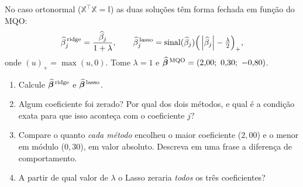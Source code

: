 \documentclass[11pt,a4paper]{article}
\begin{document}
\begin{exercicio}
No caso ortonormal ($\mathbb{X}^\top\mathbb{X}=\mathbb{I}$) as duas soluções têm forma fechada em
função do MQO:
\[
  \widehat\beta_j^{\,\text{ridge}} = \frac{\widehat\beta_j}{1+\lambda},
  \qquad
  \widehat\beta_j^{\,\text{lasso}}
     = \operatorname{sinal}(\widehat\beta_j)\Big(\left\lvert \widehat\beta_j \right\rvert-\tfrac{\lambda}{2}\Big)_+,
\]
onde $(u)_+=\max(u,0)$. Tome $\lambda=1$ e
$\widehat{\bbeta}^{\,\text{MQO}}=(2{,}00;\ 0{,}30;\ -0{,}80)$.
\begin{enumerate}[label=(\alph*),leftmargin=1.1cm]
  \item Calcule $\widehat{\bm{\beta}}^{\,\text{ridge}}$ e
        $\widehat{\bm{\beta}}^{\,\text{lasso}}$.
  \item Algum coeficiente foi zerado? Por qual dos dois métodos, e qual é a
        condição exata para que isso aconteça com o coeficiente $j$?
  \item Compare o quanto \emph{cada método} encolheu o maior coeficiente
        ($2{,}00$) e o menor em módulo ($0{,}30$), em valor absoluto. Descreva em
        uma frase a diferença de comportamento.
  \item A partir de qual valor de $\lambda$ o Lasso zeraria \emph{todos} os três
        coeficientes?
\end{enumerate}
\end{exercicio}
\end{document}
